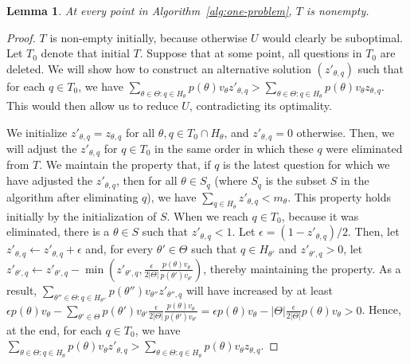 \documentclass{article}
\newtheorem{lemma}{Lemma}
\begin{document}
\begin{lemma}\label{lemma:non-empty}
At every point in Algorithm~\ref{alg:one-problem}, $T$ is nonempty.
\end{lemma}

\begin{proof}
$T$ is non-empty initially, because otherwise $U$ would clearly be suboptimal.
Let $T_0$ denote that initial $T$.  Suppose that at some point, all
questions in $T_0$ are deleted.  We will show how to construct an
alternative solution $(z'_{\theta,q})$ such that for each $q \in T_0$, we
have 
$\sum_{\theta \in
  \Theta: q \in H_\theta}p(\theta)v_\theta z'_{\theta,q} > \sum_{\theta \in
  \Theta: q \in H_\theta}p(\theta)v_\theta z_{\theta,q}$.  This would then allow us
  to reduce $U$, contradicting its optimality.

  We initialize $z'_{\theta,q} = z_{\theta, q}$ for all $\theta, q \in T_0
  \cap H_\theta$, and $z'_{\theta,q} = 0$ otherwise.  Then, we will adjust
  the $z'_{\theta, q}$ for $q \in T_0$ in the same order in which these $q$
  were eliminated from $T$.  We maintain the property that, if $q$ is the
  latest question for which we have adjusted the $z'_{\theta,q}$, then for
  all $\theta \in S_q$ (where $S_q$ is the subset $S$ in the algorithm
  after eliminating $q$), we have $\sum_{q \in H_\theta} z'_{\theta,q} <
  m_\theta$.  This property holds initially by the initialization of $S$.
  When we reach $q \in T_0$, because it was eliminated, there is a $\theta
  \in S$ such that $z'_{\theta,q} < 1$. Let $\epsilon = (1 - z'_{\theta,q})/2$.
Then, let $z'_{\theta,q} \leftarrow z'_{\theta,q} + \epsilon$ and, for
every $\theta' \in \Theta$ such that $q \in H_{\theta'}$ and $z'_{\theta',q}
>0$, let  $z'_{\theta',q} \leftarrow  z'_{\theta',q} - \min(z'_{\theta',q},
\frac{\epsilon}{2 |\Theta|} \frac{p(\theta)v_\theta}{p(\theta')v_{\theta'}})$,
thereby maintaining the property. 
As a result, $\sum_{\theta'' \in
  \Theta: q \in H_{\theta''}}p(\theta'')v_{\theta''} z'_{\theta'',q}$ will have
increased by at least  $\epsilon p(\theta)v_{\theta} - \sum_{\theta' \in
\Theta} p(\theta')v_{\theta'} \frac{\epsilon}{2 |\Theta|}
\frac{p(\theta)v_\theta}{p(\theta')v_{\theta'}}  = 
\epsilon p(\theta)v_{\theta} - |\Theta| \frac{\epsilon}{2 |\Theta|} p(\theta)v_\theta >0$.
Hence, at the end, for each $q \in T_0$, we
have 
$\sum_{\theta \in
  \Theta: q \in H_\theta}p(\theta)v_\theta z'_{\theta,q} > \sum_{\theta \in
  \Theta: q \in H_\theta}p(\theta)v_\theta z_{\theta,q}$.
\end{proof}
\end{document}
